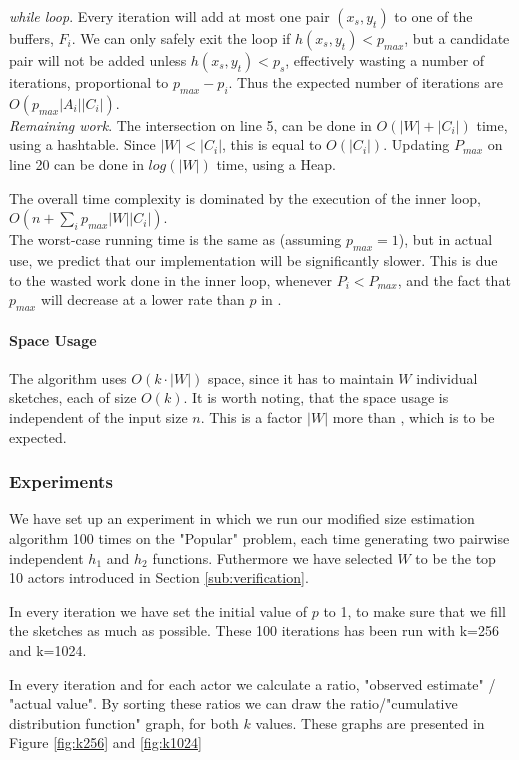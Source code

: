 \documentclass[a4paper,11pt]{article}
\begin{document}
\textit{while loop}. Every iteration will add at most one pair $(x_s, y_t)$ to one of the buffers, $F_i$. We can only safely exit the loop if $h(x_s, y_t) < p_{max}$, but a candidate pair will not be added unless $h(x_s, y_t) < p_s$, effectively wasting a number of iterations, proportional to $p_{max}-p_i$. Thus the expected number of iterations are $O(p_{max}|A_i||C_i|)$.\\

\textit{Remaining work}.
The intersection on line 5, can be done in $O(|W|+|C_i|)$ time, using a hashtable. Since $|W|<|C_i|$, this is equal to $O(|C_i|)$.
Updating $P_{max}$ on line 20 can be done in $log(|W|)$ time, using a Heap.

The overall time complexity is dominated by the execution of the inner loop, $O(n + \sum_i p_{max}|W||C_i|)$.\\

The worst-case running time is the same as \cite{paper:amossen} (assuming $p_{max} = 1$), but in actual use, we predict that our implementation will be significantly slower. This is due to the wasted work done in the inner loop, whenever $P_i < P_{max}$, and the fact that $p_{max}$ will decrease at a lower rate than $p$ in \cite{paper:amossen}.

\paragraph{Space Usage}
The algorithm uses $O(k\cdot|W|)$ space, since it has to maintain $W$ individual sketches, each of size $O(k)$. It is worth noting, that the space usage is independent of the input size $n$. This is a factor $|W|$ more than \cite{paper:amossen}, which is to be expected.

\subsubsection{Experiments}
We have set up an experiment in which we run our modified size estimation algorithm 100 times on the "Popular" problem, 
each time generating two pairwise independent $h_1$ and $h_2$ functions. 
Futhermore we have selected $W$ to be the top 10 actors introduced in Section \ref{sub:verification}. 

In every iteration we have set the initial value of $p$ to 1, to make sure that we fill the sketches as much as possible.
These 100 iterations has been run with k=256 and k=1024. 

In every iteration and for each actor we calculate a ratio, "observed estimate" / "actual value". By sorting these ratios we can draw the ratio/"cumulative distribution function" graph, for both $k$ values. These graphs are presented in Figure \ref{fig:k256} and \ref{fig:k1024}
\end{document}
